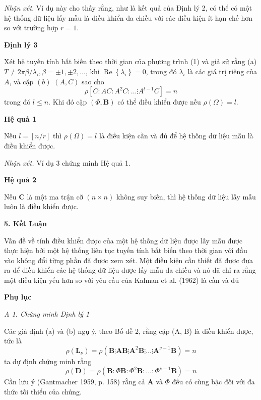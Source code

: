 \documentclass[12pt,a4paper]{article}
\begin{document}
\textit{Nhận xét}. Ví dụ này cho thấy rằng, như là kết quả của Định lý 2, có thể có một hệ thống dữ liệu lấy mẫu là điều khiển đa chiều với các điều kiện ít hạn chế hơn so với trường hợp $r=1$.

\textbf{Định lý 3}

Xét hệ tuyến tính bất biến theo thời gian của phương trình (1) và giả sử rằng (a) $T \neq 2 \pi \beta / \lambda_i, \beta= \pm 1, \pm 2, \ldots$, khi $\operatorname{Re}\left\{\lambda_i \right\}=0$, trong đó $\lambda_i$ là các giá trị riêng của $A$, và cặp $(b)$ $(A, C)$ sao cho
$$
\rho\left[C: A C: A^2 C: \ldots \vdots A^{l-1} C\right]=n
$$
trong đó $l \leqslant n$. Khi đó cặp $(\Phi, \mathbf{B})$ có thể điều khiển được nếu $\rho(\Omega)=l$.

\textbf{Hệ quả 1}

Nếu $l=[n / r]$ thì $\rho(\Omega)=l$ là điều kiện cần và đủ để hệ thống dữ liệu mẫu là điều khiển được.

\textit{Nhận xét.} Ví dụ 3 chứng minh Hệ quả 1.

\textbf{Hệ quả 2}

Nếu $\boldsymbol{C}$ là một ma trận cỡ $(n \times n)$ không suy biến, thì hệ thống dữ liệu lấy mẫu luôn là điều khiển được.

\textbf{5. Kết Luận}

Vấn đề về tính điều khiển được của một hệ thống dữ liệu được lấy mẫu được thực hiện bởi một hệ thống liên tục tuyến tính bất biến theo thời gian với đầu vào không đổi từng phần đã được xem xét. Một điều kiện cần thiết đã được đưa ra để điều khiển các hệ thống dữ liệu được lấy mẫu đa chiều và nó đã chỉ ra rằng một điều kiện yếu hơn so với yêu cầu của Kalman et al. (1962) là cần và đủ

\textbf{Phụ lục}

\textit{A 1. Chứng minh Định lý 1}

Các giả định (a) và (b) ngụ ý, theo Bổ đề 2, rằng cặp (A, B) là điều khiển được, tức là
\begin{equation}\label{pt11}\tag{11}
	\rho\left(\mathbf{L}_\nu\right)=\rho\left(\mathbf{B} \vdots \mathbf{A B} \vdots \mathbf{A}^2 \mathbf{B} \vdots \ldots \vdots \mathbf{A}^{\nu-1} \mathbf{B}\right)=n
\end{equation}
ta dự định chứng minh rằng
$$
\rho(\mathbf{D})=\rho\left(\mathbf{B}: \Phi \mathbf{B}: \Phi^2 \mathbf{B}: \ldots: \Phi^{\nu-1 } \mathbf{B}\right)=n
$$
Cần lưu ý (Gantmacher 1959, p. 158) rằng cả $\mathbf{A}$ và $\Phi$ đều có cùng bậc đối với đa thức tối thiểu của chúng.
\end{document}
